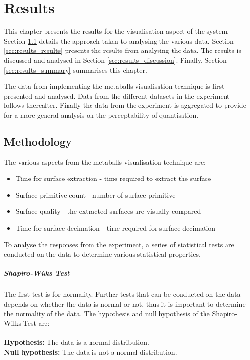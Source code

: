 \graphicspath{{./results/}}

\chapter{Results}
\label{cha:results}

This chapter presents the results for the visualisation aspect of the system.
Section \ref{sec:results_methodology} details the approach taken to analysing
the various data. Section \ref{sec:results_results} presents the results from
analysing the data. The results is discussed and analysed in Section
\ref{sec:results_discussion}. Finally, Section \ref{sec:results_summary}
summarises this chapter.

The data from implementing the metaballs visualisation technique is first
presented and analysed. Data from the different datasets in the experiment
follows thereafter. Finally the data from the experiment is aggregated to
provide for a more general analysis on the perceptability of quantisation.

\section{Methodology}
\label{sec:results_methodology}

The various aspects from the metaballs visualisation technique are:
\begin{itemize}
  \item Time for surface extraction - time required to extract the surface
  \item Surface primitive count - number of surface primitive
  \item Surface quality - the extracted surfaces are visually compared
  \item Time for surface decimation - time required for surface decimation
\end{itemize}

To analyse the responses from the experiment, a series of statistical tests are
conducted on the data to determine various statistical properties.

\paragraph{Shapiro-Wilks Test}
The first test is for normality. Further tests that can be conducted on the
data depends on whether the data is normal or not, thus it is important to
determine the normality of the data. The hypothesis and null hypothesis of the
Shapiro-Wilks Test are: \\ \\
\textbf{Hypothesis:} The data is a normal distribution. \\
\textbf{Null hypothesis:} The data is not a normal distribution.


